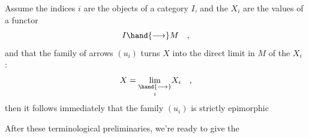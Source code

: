  Assume the indices $i$ are the objects of a category $I$, and the
$X_i$ are the values of a functor
\[ I \hand{\longrightarrow} M \quad , \]
and that the family of arrows $(u_i)$ turns $X$ into the direct limit in $M$
of the $X_i$ :
\[ X = \underset{i}{\underset{\hand{\longrightarrow}}{\mathrm{lim}}} X_i \quad , \]
then it follows immediately that the family $(u_i)$ is strictly epimorphic

After these terminological preliminaries, we're ready to give the

